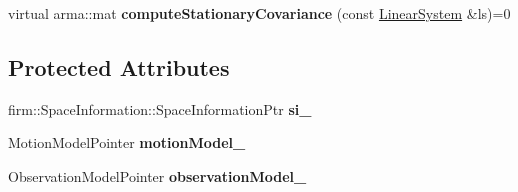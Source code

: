 \begin{DoxyCompactItemize}
\item 
\hypertarget{class_kalman_filter_method_a8f9d8ae8cf4e3bd0138d731bd2539441}{virtual arma\-::mat {\bfseries compute\-Stationary\-Covariance} (const \hyperlink{class_linear_system}{\-Linear\-System} \&ls)=0}\label{class_kalman_filter_method_a8f9d8ae8cf4e3bd0138d731bd2539441}

\end{DoxyCompactItemize}
\subsection*{\-Protected \-Attributes}
\begin{DoxyCompactItemize}
\item 
\hypertarget{class_kalman_filter_method_a9a2355339d83656f5db7c86a60d12822}{firm\-::\-Space\-Information\-::\-Space\-Information\-Ptr {\bfseries si\-\_\-}}\label{class_kalman_filter_method_a9a2355339d83656f5db7c86a60d12822}

\item 
\hypertarget{class_kalman_filter_method_a5969ade2e4d4f70a1cccc2f2f2bf4bb3}{\-Motion\-Model\-Pointer {\bfseries motion\-Model\-\_\-}}\label{class_kalman_filter_method_a5969ade2e4d4f70a1cccc2f2f2bf4bb3}

\item 
\hypertarget{class_kalman_filter_method_a43191b745846715c66854634ba58e85c}{\-Observation\-Model\-Pointer {\bfseries observation\-Model\-\_\-}}\label{class_kalman_filter_method_a43191b745846715c66854634ba58e85c}

\end{DoxyCompactItemize}
